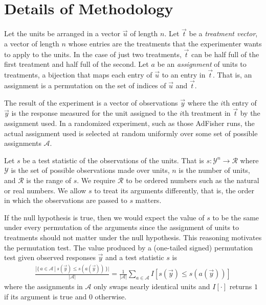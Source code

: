 \documentclass{article}
\newcommand*{\set}[2]{\{\,{#1}~|~{#2}\,\}}
\newcommand{\mc}{\mathcal}
\begin{document}



\appendix













\section{Details of Methodology}\label{app:stat}



Let the units be arranged in a vector $\vec{u}$ of length $n$.  Let $\vec{t}$ be a \emph{treatment vector}, a vector of length $n$ whose entries are the treatments that the experimenter wants to apply to the units.  In the case of just two treatments, $\vec{t}$ can be half full of the first treatment and half full of the second.  Let $a$ be an \emph{assignment} of units to treatments, a bijection that maps each entry of $\vec{u}$ to an entry in $\vec{t}$.  That is, an assignment is a permutation on the set of indices of $\vec{u}$ and $\vec{t}$.

The result of the experiment is a vector of observations $\vec{y}$ where the $i$th entry of $\vec{y}$ is the response measured for the unit assigned to the $i$th treatment in $\vec{t}$ by the assignment used.
In a randomized experiment, such as those AdFisher runs, the actual assignment used is selected at random uniformly over some set of possible assignments $\mc{A}$.

Let $s$ be a test statistic of the observations of the units.  That is $s : \mc{Y}^n \to \mc{R}$ where $\mc{Y}$ is the set of possible observations made over units, $n$ is the number of units, and $\mc{R}$ is the range of $s$.  We require $\mc{R}$ to be ordered numbers such as the natural or real numbers.
We allow $s$ to treat its arguments differently, that is, the order in which the observations are passed to $s$ matters.

If the null hypothesis is true, then we would expect the value of $s$ to be the same under every permutation of the arguments since the assignment of units to treatments should not matter under the null hypothesis.
This reasoning motivates the permutation test.
The value produced by a (one-tailed signed) permutation test given observed responses $\vec{y}$ and a test statistic $s$ is
\begin{align}
\frac{|\set{a \in \mc{A}}{s(\vec{y}) \leq s(a(\vec{y}))}|}{|\mc{A}|}
= \frac{1}{|\mc{A}|} \sum_{a \in \mc{A}} I[s(\vec{y}) \leq s(a(\vec{y}))] \label{eqn:pt}
\end{align}
where the assignments in $\mc{A}$ only swaps nearly identical units and $I[\cdot]$ returns $1$ if its argument is true and $0$ otherwise.
\end{document}
